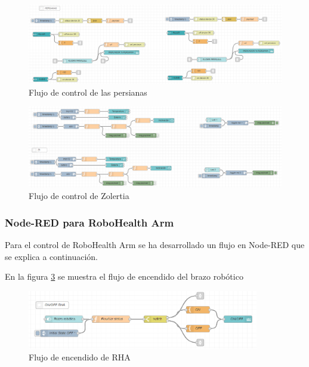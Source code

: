 \begin{figure}[H]
\centering
\includegraphics[width=1\textwidth]{figuras/persianasFlow.png}
\caption{Flujo de control de las persianas}
\label{fig:persianasFlow}
\end{figure}

\begin{figure}[H]
\centering
\includegraphics[width=1\textwidth]{figuras/zolertiaFlow.png}
\caption{Flujo de control de Zolertia}
\label{fig:zolertiaFlow}
\end{figure}

\subsubsection{Node-RED para RoboHealth Arm}

Para el control de RoboHealth Arm se ha desarrollado un flujo en Node-RED que se explica a continuación.

En la figura \ref{fig:ONOFFRHA} se muestra el flujo de encendido del brazo robótico

\begin{figure}[H]
\centering
\includegraphics[width=0.9\textwidth]{figuras/ONOFFFlowRHA.png}
\caption{Flujo de encendido de RHA}
\label{fig:ONOFFRHA}
\end{figure}

